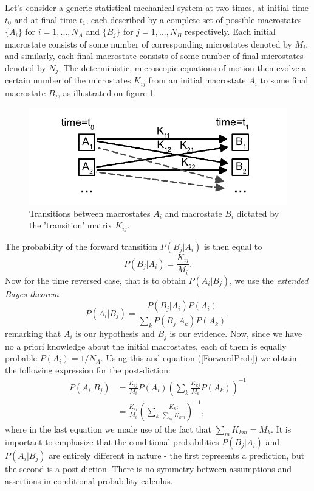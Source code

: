 \documentclass[a4paper,12pt]{article}
\begin{document}
Let's consider a generic statistical mechanical system at two times, at initial time $t_0$ and at final time $t_1$, each described by a complete set of possible macrostates $\{A_i\}$ for $ i=1,...,N_A $ and $\{B_j\}$ for $ j=1,...,N_B $  respectively. Each initial macrostate consists of some number of corresponding microstates denoted by $M_i$, and similarly, each final macrostate consists of some number of final microstates denoted by $N_j$. The deterministic, microscopic equations of motion then evolve a certain number of the microstates $K_{ij}$ from an initial macrostate $A_i$ to some final macrostate $B_j$, as illustrated on figure \ref{Fig4}.
\begin{figure}[ht!]
\centering \includegraphics[width=15cm]{figure4} 
\caption{Transitions between macrostates ${A_i}$ and macrostate ${B_i}$ dictated by the 'transition' matrix $K_{ij}$.}
\label{Fig4} 
\end{figure}
The probability of the forward transition $P(B_j|A_i)$ is then equal to
\begin{equation}
\label{ForwardProb}
  P(B_j|A_i)= \frac{K_{ij}}{M_i}.
\end{equation}
Now for the time reversed case, that is to obtain $P(A_i|B_j)$, we use the \textit{extended Bayes theorem}
\begin{equation}
  P(A_i|B_j)=\frac{P(B_j|A_i)P(A_i)}{\sum_k P(B_j|A_k)P(A_k)},
\end{equation}
remarking that $A_i$ is our hypothesis and $B_j$ is our evidence. Now, since we have no a priori knowledge about the initial macrostates, each of them is equally probable $P(A_i)= 1/N_A$. Using this and equation (\ref{ForwardProb}) we obtain the following expression for the post-diction:
\begin{equation}
\begin{aligned}
  P(A_i|B_j) &= \frac{K_{ij}}{M_i} P(A_i) \left( \sum_k \frac{K_{kj}}{M_k}P(A_k) \right)^{-1}\\
  &= \frac{K_{ij}}{M_i} \left( \sum_{k} \frac{K_{kj}}{\sum_m K_{km}} \right)^{-1},
\end{aligned}
\end{equation}
where in the last equation we made use of the fact that $\sum_m K_{km}=M_k $.
It is important to emphasize that the conditional probabilities $P(B_j|A_i)$ and $P(A_i|B_j)$ are entirely different in nature - the first represents a prediction, but the second is a post-diction. There is no symmetry between assumptions and assertions in conditional probability calculus.
\end{document}
